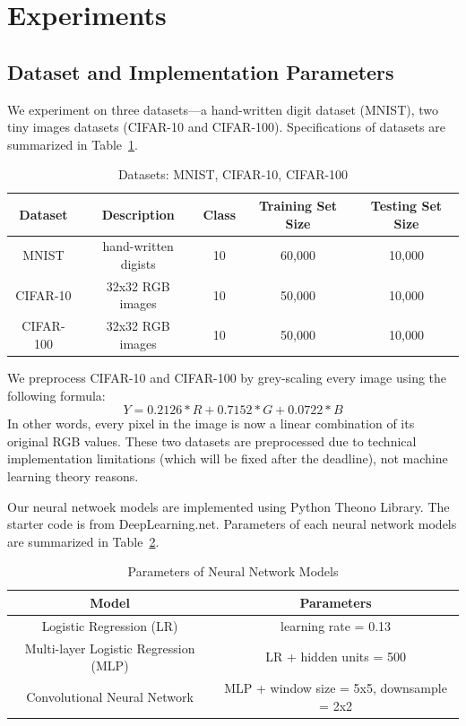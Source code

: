 \section{Experiments}
\label{sec:experiments}

\subsection{Dataset and Implementation Parameters}
We experiment on three datasets---a hand-written digit dataset (MNIST),
two tiny images datasets (CIFAR-10 and CIFAR-100).
Specifications of datasets are summarized in Table~\ref{datasets}.
\vspace{-7pt}
\begin{table}[!htbp]
\centering
\begin{tabular}{| c | c | c | c | c |}
\hline
Dataset & Description & Class & Training Set Size & Testing Set Size \\
\hline
MNIST & hand-written digists & 10 & 60,000 & 10,000\\
CIFAR-10 & 32x32 RGB images & 10 & 50,000 & 10,000\\
CIFAR-100 & 32x32 RGB images & 10 & 50,000 & 10,000\\
\hline
\end{tabular}
\caption{Datasets: MNIST, CIFAR-10, CIFAR-100}
\label{datasets}
\end{table}

We preprocess CIFAR-10 and CIFAR-100 by grey-scaling every image using the following formula:
\[
Y = 0.2126 * R + 0.7152 * G + 0.0722 * B
\]
In other words, every pixel in the image is now a linear combination of its
original RGB values. These two datasets are preprocessed due to technical
implementation limitations (which will be fixed after the deadline), not
machine learning theory reasons.

Our neural netwoek models are implemented using Python Theono Library. The
starter code is from DeepLearning.net. Parameters of each neural
network models are summarized in Table~\ref{params}.
\vspace{-7pt}
\begin{table}[!htbp]
\centering
\begin{tabular}{| c | c |}
\hline
Model & Parameters \\
\hline
Logistic Regression (LR) & learning rate = 0.13 \\
Multi-layer Logistic Regression (MLP) & LR + hidden units = 500 \\
Convolutional Neural Network & MLP + window size = 5x5, downsample = 2x2\\
\hline
\end{tabular}
\caption{Parameters of Neural Network Models}
\label{params}
\end{table}

